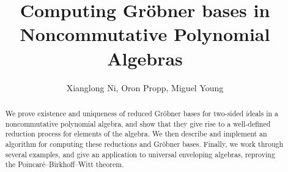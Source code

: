 \documentclass[10pt,a4paper]{amsart}
\begin{document}
	
	\title{Computing Gr\"obner bases in Noncommutative Polynomial Algebras}
	\author{Xianglong Ni, Oron Propp, Miguel Young }
	
	\maketitle
	
    \begin{abstract}
    We prove existence and uniqueness of reduced Gr\"obner bases for two-sided ideals in a noncommutative polynomial algebra, and show that they give rise to a well-defined reduction process for elements of the algebra. We then describe and implement an algorithm for computing these reductions and Gr\"obner bases. Finally, we work through several examples, and give an application to universal enveloping algebras, reproving the Poincar\'e--Birkhoff--Witt theorem.
    \end{abstract}

	\tableofcontents

    
    
    
    
    
    

    
	
\end{document}
